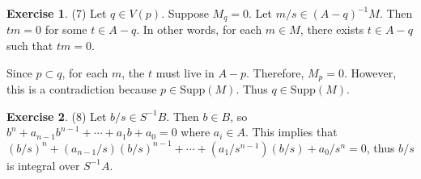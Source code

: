 \documentclass[12pt, psamsfonts]{amsart}
\theoremstyle{definition}
\newtheorem*{exer}{Exercise}
\theoremstyle{remark}
\numberwithin{equation}{section}
\begin{document}
\begin{exer}{(7)}
  Let $q \in V(p)$.
  Suppose $M_q = 0$.
  Let $m / s \in (A - q)^{-1}M$.
  Then $tm = 0$ for some $t \in A - q$.
  In other words, for each $m \in M$, there exists $t \in A - q$ such that $tm = 0$.

  Since $p \subset q$, for each $m$, the $t$ must live in $A - p$.
  Therefore, $M_p = 0$.
  However, this is a contradiction because $p \in \text{Supp}(M)$.
  Thus $q \in \text{Supp}(M)$.
\end{exer}

\begin{exer}{(8)}
  Let $b / s \in S^{-1}B$.
  Then $b \in B$, so $b^n + a_{n - 1}b^{n - 1} + \cdots + a_1b + a_0 = 0$ where $a_i \in A$.
  This implies that $(b / s)^n + (a_{n - 1} / s)(b / s)^{n - 1} + \cdots + (a_1 / s^{n - 1})(b / s) + a_0 / s^n = 0$, thus $b / s$ is integral over $S^{-1}A$.
\end{exer}
\end{document}
